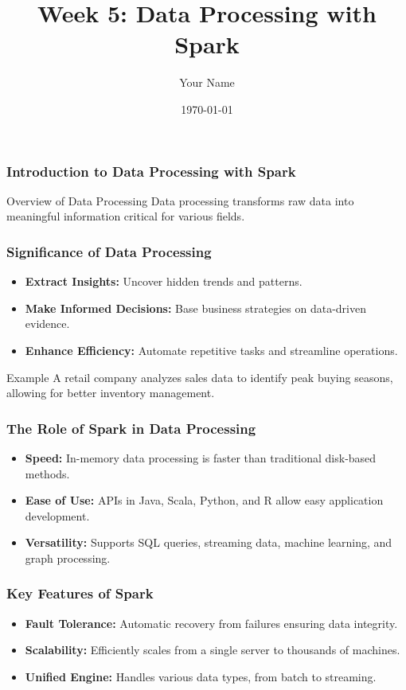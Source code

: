 \documentclass{beamer}
\title{Week 5: Data Processing with Spark}
\author{Your Name}
\institute{Your Institution}
\date{\today}
\begin{document}
\frame{\titlepage}

\begin{frame}[fragile]
    \frametitle{Introduction to Data Processing with Spark}
    \begin{block}{Overview of Data Processing}
        Data processing transforms raw data into meaningful information critical for various fields.
    \end{block}
\end{frame}

\begin{frame}[fragile]
    \frametitle{Significance of Data Processing}
    \begin{itemize}
        \item \textbf{Extract Insights:} Uncover hidden trends and patterns.
        \item \textbf{Make Informed Decisions:} Base business strategies on data-driven evidence.
        \item \textbf{Enhance Efficiency:} Automate repetitive tasks and streamline operations.
    \end{itemize}
    \begin{block}{Example}
        A retail company analyzes sales data to identify peak buying seasons, allowing for better inventory management.
    \end{block}
\end{frame}

\begin{frame}[fragile]
    \frametitle{The Role of Spark in Data Processing}
    \begin{itemize}
        \item \textbf{Speed:} In-memory data processing is faster than traditional disk-based methods.
        \item \textbf{Ease of Use:} APIs in Java, Scala, Python, and R allow easy application development.
        \item \textbf{Versatility:} Supports SQL queries, streaming data, machine learning, and graph processing.
    \end{itemize}
\end{frame}

\begin{frame}[fragile]
    \frametitle{Key Features of Spark}
    \begin{itemize}
        \item \textbf{Fault Tolerance:} Automatic recovery from failures ensuring data integrity.
        \item \textbf{Scalability:} Efficiently scales from a single server to thousands of machines.
        \item \textbf{Unified Engine:} Handles various data types, from batch to streaming.
    \end{itemize}
\end{frame}
\end{document}
